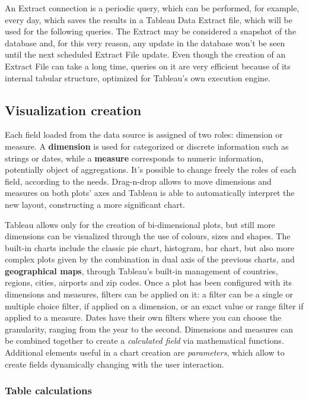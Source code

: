 An Extract connection is a periodic query, which can be performed, for example, every day, which saves the results in a Tableau Data Extract file, which will be used for the following queries. The Extract may be considered a snapshot of the database and, for this very reason, any update in the database won't be seen until the next scheduled Extract File update. Even though the creation of an Extract File can take a long time, queries on it are very efficient because of its internal tabular structure, optimized for Tableau's own execution engine.

\subsection{Visualization creation}

Each field loaded from the data source is assigned of two roles: dimension or measure. A \textbf{dimension} is used for categorized or discrete information such as strings or dates, while a \textbf{measure} corresponds to numeric information, potentially object of aggregations. It's possible to change freely the roles of each field, according to the needs. Drag-n-drop allows to move dimensions and measures on both plots' axes and Tableau is able to automatically interpret the new layout, constructing a more significant chart.

Tableau allows only for the creation of bi-dimensional plots, but still more dimensions can be visualized through the use of colours, sizes and shapes.
The built-in charts include the classic pie chart, histogram, bar chart, but also more complex plots given by the combination in dual axis of the previous charts, and \textbf{geographical maps}, through Tableau's built-in management of countries, regions, cities, airports and zip codes. 
Once a plot has been configured with its dimensions and measures, filters can be applied on it: a filter can be a single or multiple choice filter, if applied on a dimension, or an exact value or range filter if applied to a measure. Dates have their own filters where you can choose the granularity, ranging from the year to the second.
Dimensions and measures can be combined together to create a \textit{calculated field} via mathematical functions.
Additional elements useful in a chart creation are \textit{parameters}, which allow to create fields dynamically changing with the user interaction.

\subsubsection{Table calculations}

